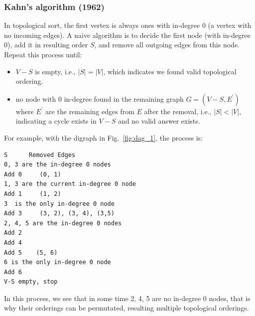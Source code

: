 \documentclass[../main.tex]{subfiles}
\begin{document}
\subsubsection{Kahn's algorithm (1962)} In topological sort, the first vertex is always ones with in-degree 0 (a vertex with no incoming edges). A naive algorithm is to decide the first node (with in-degree 0), add it in resulting order $S$, and remove all outgoing edges from this node. Repeat this process until: 
\begin{itemize}
    \item $V-S$ is empty, i.e., $|S|=|V|$, which indicates we found valid topological ordering.
    \item no node with 0 in-degree found in the remaining graph $G = (V-S, E^{'})$ where $E^{'}$ are the remaining edges from $E$ after the removal, i.e., $|S| < |V|$, indicating a cycle exists in $V-S$ and no valid answer exists.
\end{itemize}
For example, with the digraph in Fig.~\ref{fig:dag_1}, the process is:
\begin{lstlisting}[numbers=none]
S      Removed Edges
0, 3 are the in-degree 0 nodes
Add 0     (0, 1) 
1, 3 are the current in-degree 0 node
Add 1     (1, 2) 
3  is the only in-degree 0 node
Add 3     (3, 2), (3, 4), (3,5)
2, 4, 5 are the in-degree 0 nodes
Add 2
Add 4
Add 5    (5, 6)
6 is the only in-degree 0 node
Add 6
V-S empty, stop
\end{lstlisting}
In this process, we see that in some time 2, 4, 5 are no in-degree 0 nodes, that is why their orderings can be permutated, resulting multiple topological orderings. 
\end{document}
